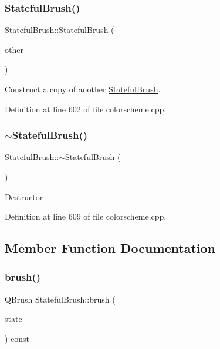\mbox{\label{class_stateful_brush_af4916a67dc47a42174de13f2ea6736ba}} 
\subsubsection{\texorpdfstring{Stateful\+Brush()}{StatefulBrush()}\hspace{0.1cm}{\footnotesize\ttfamily [7/7]}}
{\footnotesize\ttfamily Stateful\+Brush\+::\+Stateful\+Brush (\begin{DoxyParamCaption}\item[{const \hyperlink{class_stateful_brush}{Stateful\+Brush} \&}]{other }\end{DoxyParamCaption})}

Construct a copy of another \hyperlink{class_stateful_brush}{Stateful\+Brush}. 

Definition at line 602 of file colorscheme.\+cpp.

\mbox{\label{class_stateful_brush_a376e4cc7b8d5f76b520dcb2aa27d8161}} 
\subsubsection{\texorpdfstring{$\sim$\+Stateful\+Brush()}{~StatefulBrush()}}
{\footnotesize\ttfamily Stateful\+Brush\+::$\sim$\+Stateful\+Brush (\begin{DoxyParamCaption}{ }\end{DoxyParamCaption})}

Destructor 

Definition at line 609 of file colorscheme.\+cpp.



\subsection{Member Function Documentation}
\mbox{\label{class_stateful_brush_a7019e41f2932aafcefcce57623c4fb2c}} 
\subsubsection{\texorpdfstring{brush()}{brush()}\hspace{0.1cm}{\footnotesize\ttfamily [1/3]}}
{\footnotesize\ttfamily Q\+Brush Stateful\+Brush\+::brush (\begin{DoxyParamCaption}\item[{Q\+Palette\+::\+Color\+Group}]{state }\end{DoxyParamCaption}) const}

